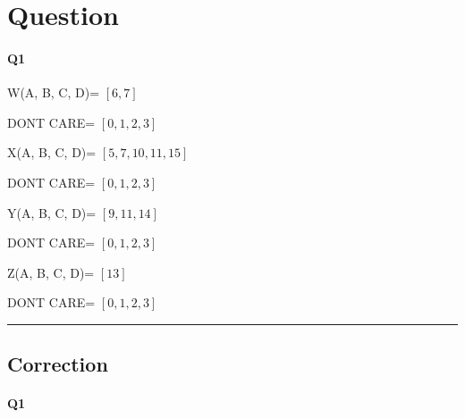 
\section{Question}


\paragraph{Q1}


W(A, B, C, D)= $[6, 7]$

DONT CARE= $[0, 1, 2, 3]$

X(A, B, C, D)= $[5, 7, 10, 11, 15]$

DONT CARE= $[0, 1, 2, 3]$

Y(A, B, C, D)= $[9, 11, 14]$

DONT CARE= $[0, 1, 2, 3]$

Z(A, B, C, D)= $[13]$

DONT CARE= $[0, 1, 2, 3]$




\hrule width 1\linewidth
\pagebreak

\subsection{Correction}


\paragraph{Q1}

